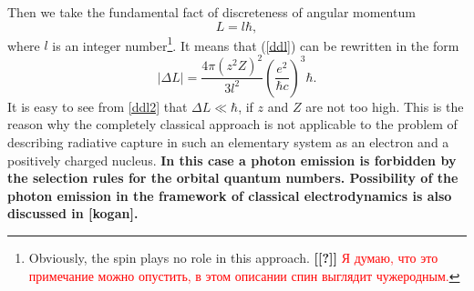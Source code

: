 \documentclass{SovJurn/JETPL}
\begin{document}
Then we take the fundamental fact of discreteness of angular momentum
\begin{equation}
L=l\hbar,
\label{q_ang_mom}
\end{equation}
where $l$ is an integer number\footnote{Obviously, the spin plays no role in this approach. \textbf{[[?]]} \textcolor{Red}{Я думаю, что это примечание можно опустить, в этом описании спин выглядит чужеродным.}}. It means that (\ref{ddl}) can be rewritten in the form
\begin{equation}
|\Delta L|=\frac{4\pi (z^2Z)^2}{3l^2}\left(\frac{e^2}{\hbar c}\right)^3\hbar.
\label{ddl2}
\end{equation}
It is easy to see from \eqref{ddl2} that $\Delta L \ll \hbar$, if $z$ and $Z$ are not too high. This is the reason why the completely classical approach is not applicable to the problem of describing radiative capture in such an elementary system as an electron and a positively charged nucleus. \textbf{In this case a photon emission is forbidden by the selection rules for the orbital quantum numbers. Possibility of the photon emission in the framework of classical electrodynamics is also discussed in [kogan]. }
\end{document}

